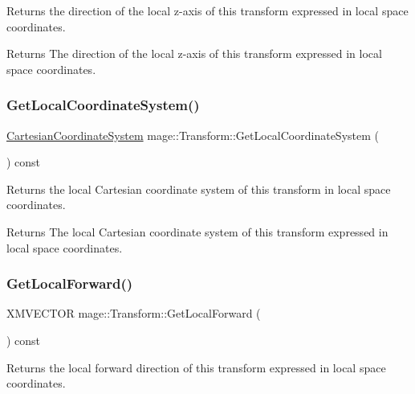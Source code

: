 Returns the direction of the local z-\/axis of this transform expressed in local space coordinates.

\begin{DoxyReturn}{Returns}
The direction of the local z-\/axis of this transform expressed in local space coordinates. 
\end{DoxyReturn}
\hypertarget{structmage_1_1_transform_aa88457f582eca76b7305349e197bce7f}{}\label{structmage_1_1_transform_aa88457f582eca76b7305349e197bce7f} 
\subsubsection{\texorpdfstring{Get\+Local\+Coordinate\+System()}{GetLocalCoordinateSystem()}}
{\footnotesize\ttfamily \hyperlink{structmage_1_1_cartesian_coordinate_system}{Cartesian\+Coordinate\+System} mage\+::\+Transform\+::\+Get\+Local\+Coordinate\+System (\begin{DoxyParamCaption}{ }\end{DoxyParamCaption}) const}

Returns the local Cartesian coordinate system of this transform in local space coordinates.

\begin{DoxyReturn}{Returns}
The local Cartesian coordinate system of this transform expressed in local space coordinates. 
\end{DoxyReturn}
\hypertarget{structmage_1_1_transform_ab029a8208164b53c75352c53736a5c38}{}\label{structmage_1_1_transform_ab029a8208164b53c75352c53736a5c38} 
\subsubsection{\texorpdfstring{Get\+Local\+Forward()}{GetLocalForward()}}
{\footnotesize\ttfamily X\+M\+V\+E\+C\+T\+OR mage\+::\+Transform\+::\+Get\+Local\+Forward (\begin{DoxyParamCaption}{ }\end{DoxyParamCaption}) const}

Returns the local forward direction of this transform expressed in local space coordinates.


